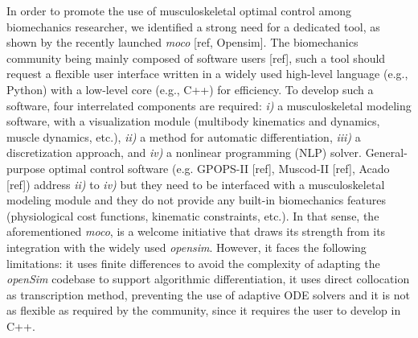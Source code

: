 In order to promote the use of musculoskeletal optimal control among biomechanics researcher, we identified a strong need for a dedicated tool, as shown by the recently launched \textit{moco} [ref, Opensim]. 
The biomechanics community being mainly composed of software users [ref], such a tool should request a flexible user interface written in a widely used high-level language (e.g., Python) with a low-level core (e.g., C++) for efficiency. 
To develop such a software, four interrelated components are required: \textit{i)} a musculoskeletal modeling software, with a visualization module (multibody kinematics and dynamics, muscle dynamics, etc.), \textit{ii)} a method for automatic differentiation, \textit{iii)} a discretization approach, and \textit{iv)} a nonlinear programming (NLP) solver. 
General-purpose optimal control software (e.g. GPOPS-II [ref], Muscod-II [ref], Acado [ref]) address \textit{ii)} to \textit{iv)} but they need to be interfaced with a musculoskeletal modeling module and they do not provide any built-in biomechanics features (physiological cost functions, kinematic constraints, etc.). 
In that sense, the aforementioned \textit{moco}, is a welcome initiative that draws its strength from its integration with the widely used \textit{opensim}.
However, it faces the following limitations: it uses finite differences to avoid the complexity of adapting the \textit{openSim} codebase to support algorithmic differentiation, it uses direct collocation as transcription method, preventing the use of adaptive ODE solvers and it is not as flexible as required by the community, since it requires the user to develop in C++. 




